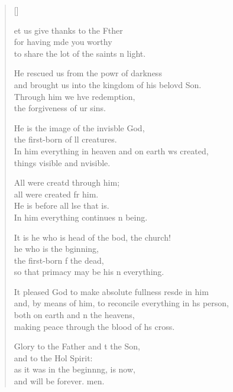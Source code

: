 \settowidth{\versewidth}{and, by means of him, to reconcile everything in his person,}
\begin{verse}[\versewidth]
  \begin{patverse}
et us give thanks to the Fther\Flex\\
for having mde you worthy\Med\\
to share the lot of the saints \pointup{\i}n light.

He rescued us from the powr of darkness\Med\\
and brought us into the kingdom of his belovd Son.\\
Through him we hve redemption,\Med\\
the forgiveness of ur sins.

He is the image of the invis\pointup{\i}ble God,\Med\\
the first-born of ll creatures.\\
In him everything in heaven and on earth ws created,\Med\\
things visible and \pointup{\i}nvisible.

All were creatd through him;\Med\\
all were created fr him.\\
He is before all lse that is.\Med\\
In him everything continues \pointup{\i}n being.

It is he who is head of the bod, the church!\Med\\
he who is the bginning,\\
the first-born f the dead,\Med\\
so that primacy may be his \pointup{\i}n everything.

It pleased God to make absolute fullness res\pointup{\i}de in him\Med\\
and, by means of him, to reconcile everything in h\pointup{\i}s person,\\
both on earth and \pointup{\i}n the heavens,\Med\\
making peace through the blood of h\pointup{\i}s cross.

Glory to the Father and t the Son,\Med\\
and to the Hol Spirit:\\
as it was in the beginn\pointup{\i}ng, is now,\Med\\
and will be forever. men. 
  \end{patverse}
\end{verse}
